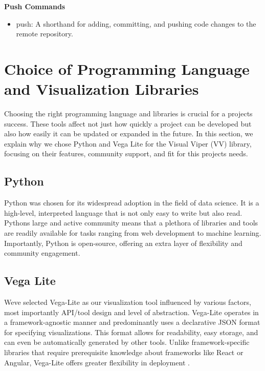 \textbf{Push Commands}

\begin{itemize}
\item
  push: A shorthand for adding, committing, and pushing code changes to
  the remote repository.
\end{itemize}

\section{Choice of Programming Language and Visualization
Libraries}\label{choice-of-programming-language-and-visualization-libraries}

Choosing the right programming language and libraries is crucial for a
project\textquotesingle s success. These tools affect not just how
quickly a project can be developed but also how easily it can be updated
or expanded in the future. In this section, we explain why we chose
Python and Vega Lite for the Visual Viper (VV) library, focusing on
their features, community support, and fit for this
project\textquotesingle s needs.

\subsection{Python}\label{python}

Python was chosen for its widespread adoption in the field of data
science. It is a high-level, interpreted language that is not only easy
to write but also read. Python\textquotesingle s large and active
community means that a plethora of libraries and tools are readily
available for tasks ranging from web development to machine learning.
Importantly, Python is open-source, offering an extra layer of
flexibility and community engagement.

\subsection{Vega Lite}\label{vega-lite}

We\textquotesingle ve selected Vega-Lite as our visualization tool
influenced by various factors, most importantly API/tool design and
level of abstraction. Vega-Lite operates in a framework-agnostic manner
and predominantly uses a declarative JSON format for specifying
visualizations. This format allows for readability, easy storage, and
can even be automatically generated by other tools. Unlike
framework-specific libraries that require prerequisite knowledge about
frameworks like React or Angular, Vega-Lite offers greater flexibility
in deployment \cite{43}.

